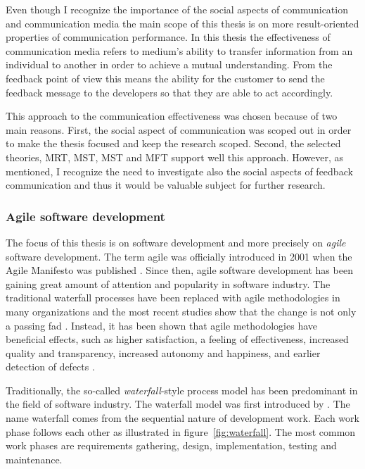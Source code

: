 \documentclass[english,12pt,a4paper,pdftex]{article}
\begin{document}
Even though I recognize the importance of the social aspects of communication and communication media the main scope of this thesis is on more result-oriented properties of communication performance. In this thesis the effectiveness of communication media refers to medium's ability to transfer information from an individual to another in order to achieve a mutual understanding. From the feedback point of view this means the ability for the customer to send the feedback message to the developers so that they are able to act accordingly.

This approach to the communication effectiveness was chosen because of two main reasons. First, the social aspect of communication was scoped out in order to make the thesis focused and keep the research scoped. Second, the selected theories, \ac{MRT}, \ac{MST}, \ac{MST} and \ac{MFT} support well this approach. However, as mentioned, I recognize the need to investigate also the social aspects of feedback communication and thus it would be valuable subject for further research.

\subsubsection{Agile software development}

The focus of this thesis is on software development and more precisely on \emph{agile} software development. The term agile was officially introduced in 2001 when the Agile Manifesto was published \citep{agilemanifesto}. Since then, agile software development has been gaining great amount of attention and popularity in software industry. The traditional waterfall processes have been replaced with agile methodologies in many organizations and the most recent studies show that the change is not only a passing fad \citep{laanti2011}. Instead, it has been shown that agile methodologies have beneficial effects, such as higher satisfaction, a feeling of effectiveness, increased quality and transparency, increased autonomy and happiness, and earlier detection of defects \citep{korhonen2012}.

Traditionally, the so-called \emph{waterfall}-style process model has been predominant in the field of software industry. The waterfall model was first introduced by \citet{royce1970}. The name waterfall comes from the sequential nature of development work. Each work phase follows each other as illustrated in figure~\ref{fig:waterfall}. The most common work phases are requirements gathering, design, implementation, testing and maintenance.
\end{document}
